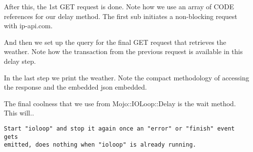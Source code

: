 \documentclass[14pt]{extreport}
\newcommand\Small{\fontsize{12}{13.0}\fontencoding{T1}\selectfont}
\newcommand*\LSTfont{\Small\ttfamily\SetTracking{encoding=*}{-60}\lsstyle}
\begin{document}
After this, the 1st GET request is done.  Note how we use an array of CODE
references for our delay method.  The first sub initiates a non-blocking
request with ip-api.com.



And then we set up the query for the final GET request that retrieves the
weather.  Note how the transaction from the previous request is available in
this delay step.



In the last step we print the weather.  Note the compact methodology of accessing
the response and the embedded json embedded.



The final coolness that we use from Mojo::IOLoop::Delay is the wait method.
This will..

\begin{lstlisting}[style=BlockStyle]
Start "ioloop" and stop it again once an "error" or "finish" event gets
emitted, does nothing when "ioloop" is already running.
\end{lstlisting}
\end{document}
